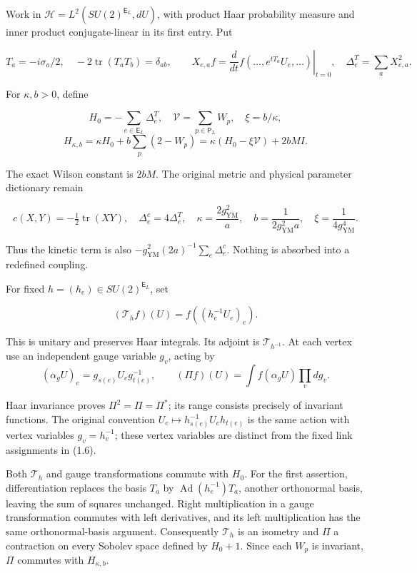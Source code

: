 \documentclass[
  11pt,
]{article}
\begin{document}
Work in \(\mathcal H=L^2(SU(2)^{\mathsf E_L},dU)\), with product Haar
probability measure and inner product conjugate-linear in its first
entry. Put

\[
T_a=-i\sigma_a/2,\quad -2\operatorname{tr}(T_aT_b)=\delta_{ab},\qquad
X_{e,a}f=\left.\frac{d}{dt}f(\ldots,e^{tT_a}U_e,\ldots)\right|_{t=0},
\quad \Delta_e^T=\sum_aX_{e,a}^2.
\tag{1.3}
\]

For \(\kappa,b>0\), define

\[
H_0=-\sum_{e\in\mathsf E_L}\Delta_e^T,\quad
\mathcal V=\sum_{p\in\mathsf P_L}W_p,\quad \xi=b/\kappa,
\] \[
H_{\kappa,b}=\kappa H_0+b\sum_p(2-W_p)
=\kappa(H_0-\xi\mathcal V)+2bM I.
\tag{1.4}
\]

The exact Wilson constant is \(2bM\). The original metric and physical
parameter dictionary remain

\[
c(X,Y)=-\tfrac12\operatorname{tr}(XY),\quad
\Delta_e^c=4\Delta_e^T,\quad
\kappa=\frac{2g_{\mathrm{YM}}^2}{a},\quad
b=\frac1{2g_{\mathrm{YM}}^2a},\quad
\xi=\frac1{4g_{\mathrm{YM}}^4}.
\tag{1.5}
\]

Thus the kinetic term is also
\(-g_{\mathrm{YM}}^2(2a)^{-1}\sum_e\Delta_e^c\). Nothing is absorbed
into a redefined coupling.

For fixed \(h=(h_e)\in SU(2)^{\mathsf E_L}\), set

\[
(\mathcal T_hf)(U)=f((h_e^{-1}U_e)_e).
\tag{1.6}
\]

This is unitary and preserves Haar integrals. Its adjoint is
\(\mathcal T_{h^{-1}}\). At each vertex use an independent gauge
variable \(g_v\), acting by \[
(\alpha_gU)_e=g_{s(e)}U_eg_{t(e)}^{-1},\qquad
(\Pi f)(U)=\int f(\alpha_gU)\prod_vdg_v.
\tag{1.7}
\]

Haar invariance proves \(\Pi^2=\Pi=\Pi^*\); its range consists precisely
of invariant functions. The original convention
\(U_e\mapsto h_{s(e)}^{-1}U_eh_{t(e)}\) is the same action with vertex
variables \(g_v=h_v^{-1}\); these vertex variables are distinct from the
fixed link assignments in (1.6).

Both \(\mathcal T_h\) and gauge transformations commute with \(H_0\).
For the first assertion, differentiation replaces the basis \(T_a\) by
\(\operatorname{Ad}(h_e^{-1})T_a\), another orthonormal basis, leaving
the sum of squares unchanged. Right multiplication in a gauge
transformation commutes with left derivatives, and its left
multiplication has the same orthonormal-basis argument. Consequently
\(\mathcal T_h\) is an isometry and \(\Pi\) a contraction on every
Sobolev space defined by \(H_0+1\). Since each \(W_p\) is invariant,
\(\Pi\) commutes with \(H_{\kappa,b}\).
\end{document}
